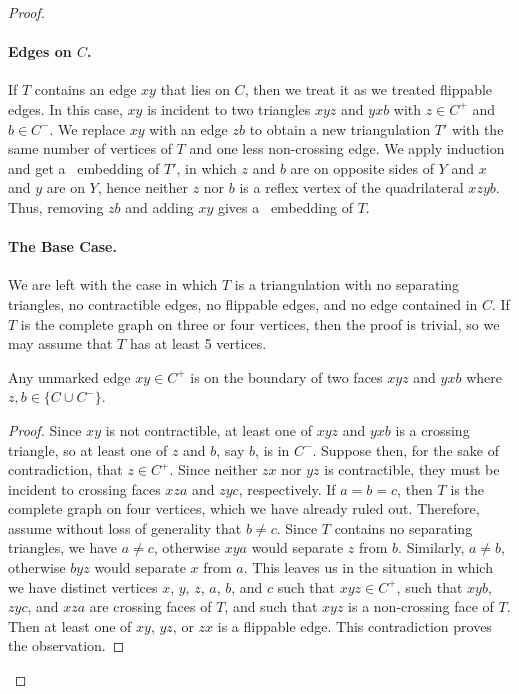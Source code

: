 \begin{proof}
	\paragraph{Edges on $C$.}
	
	If $T$ contains an edge $xy$ that lies on $C$, then we treat it as we treated flippable edges. In this case, $xy$ is incident to two triangles $xyz$ and $yxb$ with $z\in C^+$ and $b\in C^-$. We replace $xy$ with an edge $zb$ to obtain a new triangulation $T'$ with the same number of vertices of $T$ and one less non-crossing edge. We apply induction and get a \Fary\ embedding of $T'$, in which $z$ and $b$ are
	on opposite sides of $Y$ and $x$ and $y$ are on $Y$, hence 	neither $z$ nor $b$ is a reflex vertex of the quadrilateral $xzyb$.
	Thus, removing $zb$ and adding $xy$ gives a \Fary\ embedding of $T$.
	
	\paragraph{The Base Case.}
	
	We are left with the case in which $T$ is a triangulation
	with no separating triangles, no contractible edges, no flippable
	edges, and no edge contained in $C$.  If $T$ is the complete graph
	on three or four vertices, then the proof is trivial,
	so we may assume that $T$ has at least 5 vertices.
	
	\begin{claimx} 
	Any unmarked edge $xy \in C^+$ is on the boundary of two faces $xyz$ and $yxb$ where $z,b\in\{C \cup C^-\}$.
	\end{claimx}
		
	\begin{proof}
	Since $xy$ is not contractible, at least one of $xyz$ and $yxb$ is a
	crossing triangle, so at least one of $z$ and $b$, say $b$, is in $C^-$.
	Suppose then, for the sake of contradiction, that $z\in C^+$. Since neither $zx$ nor $yz$ is contractible,
	they must be incident to crossing faces $xza$ and $zyc$, respectively.
	If $a=b=c$, then $T$ is the complete graph on four vertices,
	which we have already ruled out.  Therefore, assume without loss of
	generality that $b\neq c$.  Since $T$ contains no separating triangles,
	we have $a\neq c$, otherwise $xya$ would separate $z$ from $b$. Similarly, $a\neq b$, otherwise $byz$ would separate $x$ from $a$.	
	This leaves us in the situation in which we have distinct vertices $x$,
	$y$, $z$, $a$, $b$, and $c$ such that $xyz\in C^+$, such that $xyb$, $zyc$, and $xza$
	are crossing faces of $T$, and such that $xyz$ is a non-crossing face of $T$.
	Then at least one of $xy$, $yz$, or $zx$ is a flippable edge. This contradiction proves the observation.
\end{proof}	


\end{proof}
